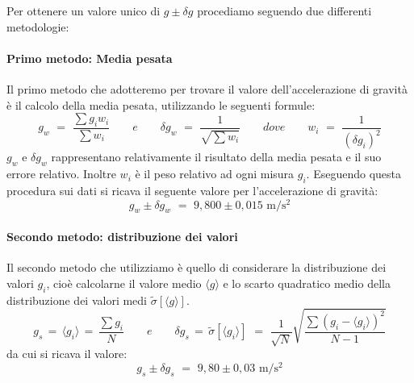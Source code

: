 Per ottenere un valore unico di $g \pm \delta g$ procediamo seguendo due differenti metodologie:

\paragraph{Primo metodo: Media pesata\\}

Il primo metodo che adotteremo per trovare il valore dell'accelerazione di gravità è il calcolo della media pesata, utilizzando le seguenti formule:
\begin{equation}
g_w \,\, = \,\, \frac{\sum g_iw_i}{\sum w_i} \quad\quad e \quad\quad \delta g_w \,\, = \,\, \frac{1}{\sqrt{\sum w_i}} \quad\quad dove \quad\quad w_i \,\, = \,\, \frac{1}{(\delta g_i)^2}
\end{equation}
%
$g_w$ e $\delta g_w$ rappresentano relativamente il risultato della media pesata e il suo errore relativo. Inoltre $w_i$ è il peso relativo ad ogni misura $g_i$.
Eseguendo questa procedura sui dati si ricava il seguente valore per l'accelerazione di gravità:
\begin{equation}
g_w \pm \delta g_w \,\, = \,\, 9,800 \pm 0,015 \,\, \si{\metre\per\square\second}
\end{equation}

\paragraph{Secondo metodo: distribuzione dei valori\\}

Il secondo metodo che utilizziamo è quello di considerare la distribuzione dei valori $g_i$, cioè calcolarne il valore medio $\langle g\rangle$ e lo scarto quadratico medio della distribuzione dei valori medi $\tilde{\sigma}[\langle g \rangle]$.
\begin{equation}
g_s \, = \, \langle g_i \rangle \, = \, \frac{\sum g_i}{N} \quad\quad e \quad\quad	\delta g_s \, = \, \tilde{\sigma}[\langle g_i \rangle] \,\, = \,\, \frac{1}{\sqrt{N}}\sqrt{\frac{\sum (g_i - \langle g_i \rangle)^2}{N-1}}
\end{equation}
%
da cui si ricava il valore:
\begin{equation}
g_s \pm \delta g_s \,\, = \,\, 9,80 \pm 0,03 \,\, \si{\metre\per\square\second}
\end{equation}

